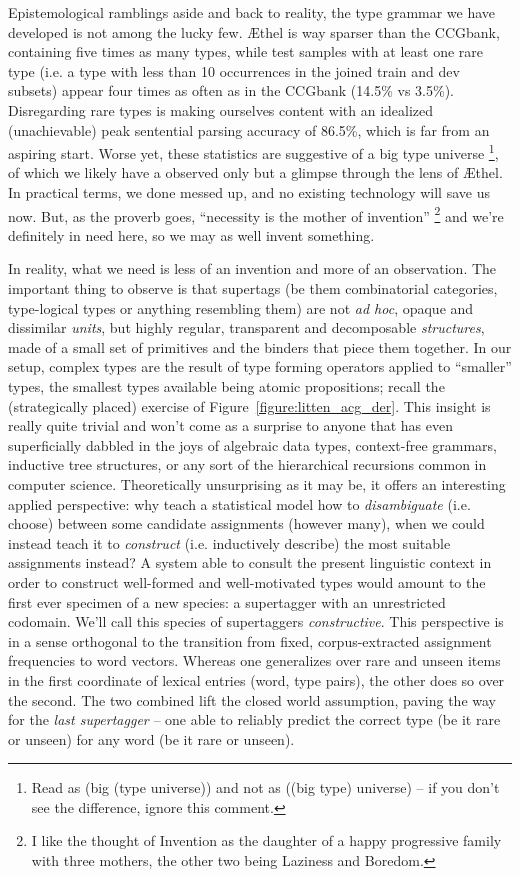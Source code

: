 Epistemological ramblings aside and back to reality, the type grammar we have developed is not among the lucky few.
\AE thel is way sparser than the CCGbank, containing five times as many types, while test samples with at least one rare type (i.e. a type with less than 10 occurrences in the joined train and dev subsets) appear four times as often as in the CCGbank (14.5\% vs 3.5\%).
Disregarding rare types is making ourselves content with an idealized (unachievable) peak sentential parsing accuracy of 86.5\%, which is far from an aspiring start.
Worse yet, these statistics are suggestive of a big type universe%
	\footnote{Read as (big (type universe)) and not as ((big type) universe) -- if you don't see the difference, ignore this comment.}, 
of which we likely have a observed only but a glimpse through the lens of \AE thel.
In practical terms, we done messed up, and no existing technology will save us now.
But, as the proverb goes, ``necessity is the mother of invention''%
	\footnote{I like the thought of Invention as the daughter of a happy progressive family with three mothers, the other two being Laziness and Boredom.}
and we're definitely in need here, so we may as well invent something.

In reality, what we need is less of an invention and more of an observation.
The important thing to observe is that supertags (be them combinatorial categories, type-logical types or anything resembling them) are not \textit{ad hoc}, opaque and dissimilar \textit{units}, but highly regular, transparent and decomposable \textit{structures}, made of a small set of primitives and the binders that piece them together.
In our setup, complex types are the result of type forming operators applied to ``smaller'' types, the smallest types available being atomic propositions; recall the (strategically placed) exercise of Figure~\ref{figure:litten_acg_der}.
This insight is really quite trivial and won't come as a surprise to anyone that has even superficially dabbled in the joys of algebraic data types, context-free grammars, inductive tree structures, or any sort of the hierarchical recursions common in computer science.
Theoretically unsurprising as it may be, it offers an interesting applied perspective: why teach a statistical model how to \textit{disambiguate} (i.e. choose) between some candidate assignments (however many), when we could instead teach it to \textit{construct} (i.e. inductively describe) the most suitable assignments instead?
A system able to consult the present linguistic context in order to construct well-formed and well-motivated types would amount to the first ever specimen of a new species: a supertagger with an unrestricted codomain.
We'll call this species of supertaggers \textit{constructive}.
This perspective is in a sense orthogonal to the transition from fixed, corpus-extracted assignment frequencies to word vectors. Whereas one generalizes over rare and unseen items in the first coordinate of lexical entries (\textlangle word, type\textrangle{} pairs), the other does so over the second.
The two combined lift the closed world assumption, paving the way for the \textit{last supertagger} -- one able to reliably predict the correct type (be it rare or unseen) for any word (be it rare or unseen).

